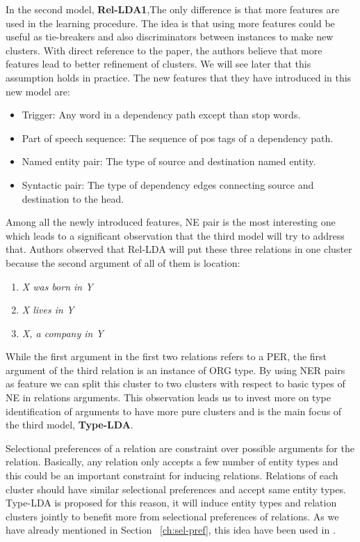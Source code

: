 \documentclass[12pt]{report}
\begin{document}
   	In the second model, \textbf{Rel-LDA1},The only difference is that  more features are used in the learning procedure.
   	 The idea is that using more features could be useful as tie-breakers and also discriminators between instances
   	  to make new clusters. With direct reference to the paper, the authors believe that more features 
   	  lead to better refinement of clusters. We will see later that this assumption holds in practice.
   	   The new features that they have introduced in this new model are:
   	   \begin{itemize}
   	     \item Trigger: Any word in a dependency path except than stop words. 
   	     \item Part of speech sequence: The sequence of pos tags of a dependency path. 
   	     \item Named entity pair: The type of source and destination named entity.
   	     \item Syntactic pair: The type of dependency edges connecting source and destination to the head.
   	   \end{itemize}   
   
 Among all the newly introduced features, NE pair is the most interesting one which leads to a 
 significant observation that the third model will try to address that. Authors observed that 
 Rel-LDA will put these three relations in one cluster because the second argument of all of them is location:
 
 \begin{enumerate}
   \item \emph{ X was born in Y}
   \item \emph{ X lives in Y}
   \item \emph{ X, a company in Y}
 \end{enumerate}
 
 While the first argument in the first two relations refers to a PER, the first argument of the 
 third relation is an instance of ORG type. By using NER pairs as feature we can split this cluster 
 to two clusters with respect to basic types of NE in relations arguments. 
 This observation leads us to invest more on type identification of arguments to have more pure 
 clusters and is the main focus of the third model, \textbf{Type-LDA}.
 
 
 Selectional preferences of a relation are constraint over possible arguments for the relation.
  Basically, any relation only accepts a few number of entity types and this could be an important constraint
   for inducing relations. Relations of each cluster should have similar selectional preferences and
    accept same entity types. Type-LDA is proposed for this reason, it will induce entity types 
    and relation clusters jointly to benefit more from selectional preferences of relations. 
    As we have already mentioned in Section ~\ref{ch:sel-pref},
     this idea have been used in \cite{Pantel2007} .
    
\end{document}
